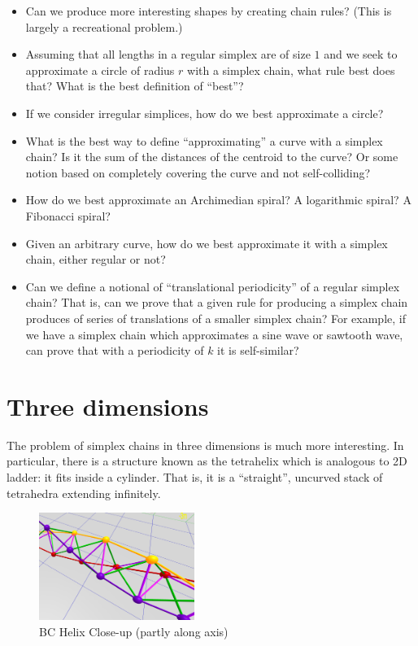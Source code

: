 \documentclass[11pt]{article}
\begin{document}
\begin{itemize}
\item Can we produce more interesting shapes by creating chain rules? (This is largely a recreational problem.)
\item Assuming that all lengths in a regular simplex are of size $1$ and we seek to approximate a circle of radius $r$ with a simplex chain,
  what rule best does that?  What is the best definition of ``best''?
\item If we consider irregular simplices, how do we best approximate a circle?
\item What is the best way to define ``approximating'' a curve with a simplex chain? Is it the sum of the distances of the centroid to the curve?
  Or some notion based on completely covering the curve and not self-colliding?
\item How do we best approximate an Archimedian spiral? A logarithmic spiral? A Fibonacci spiral?
\item Given an arbitrary curve, how do we best approximate it with a simplex chain, either regular or not?
\item Can we define a notional of ``translational periodicity'' of a regular simplex chain? That is, can we prove that
  a given rule for producing a simplex chain produces of series of translations of a smaller simplex chain? For example,
  if we have a simplex chain which approximates a sine wave or sawtooth wave, can prove that with a periodicity of $k$ it
  is self-similar?
\end{itemize}

\section{Three dimensions}

The problem of simplex chains in three dimensions is much more interesting. In particular, there is a structure known as the
tetrahelix which is analogous to 2D ladder: it fits inside a cylinder. That is, it is a ``straight'', uncurved stack
of tetrahedra extending infinitely.



\begin{figure}
  \centering
     \includegraphics[width=0.45\textwidth]{figures/BCHelixCloseUp.png}
     \caption{BC Helix Close-up (partly along axis)}
  \label{fig:closeup}     
\end{figure}
\end{document}

